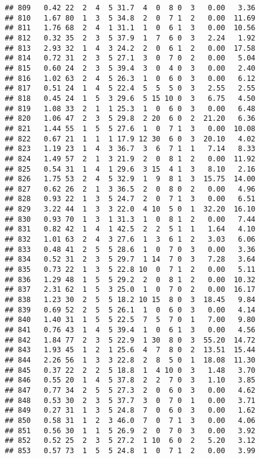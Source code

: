 \documentclass[
]{article}
\begin{document}
\begin{verbatim}
## 809   0.42 22  2  4  5 31.7  4  0  8 0  3   0.00   3.36
## 810   1.67 80  1  3  5 34.8  2  0  7 1  2   0.00  11.69
## 811   1.76 68  2  4  1 31.1  1  0  6 1  3   0.00  10.56
## 812   0.32 35  2  3  5 37.9  1  7  6 0  3   2.24   1.92
## 813   2.93 32  1  4  3 24.2  2  0  6 1  2   0.00  17.58
## 814   0.72 31  2  3  5 27.1  3  0  7 0  2   0.00   5.04
## 815   0.60 24  2  3  5 39.4  3  0  4 0  3   0.00   2.40
## 816   1.02 63  2  4  5 26.3  1  0  6 0  3   0.00   6.12
## 817   0.51 24  1  4  5 22.4  5  5  5 0  3   2.55   2.55
## 818   0.45 24  1  5  3 29.6  5 15 10 0  3   6.75   4.50
## 819   1.08 33  2  1  1 25.3  1  0  6 0  3   0.00   6.48
## 820   1.06 47  2  3  5 29.8  2 20  6 0  2  21.20   6.36
## 821   1.44 55  1  5  5 27.6  1  0  7 1  3   0.00  10.08
## 822   0.67 21  1  1  1 17.9 12 30  6 0  3  20.10   4.02
## 823   1.19 23  1  4  3 36.7  3  6  7 1  1   7.14   8.33
## 824   1.49 57  2  1  3 21.9  2  0  8 1  2   0.00  11.92
## 825   0.54 31  1  4  1 29.6  3 15  4 1  3   8.10   2.16
## 826   1.75 53  2  4  5 32.9  1  9  8 1  3  15.75  14.00
## 827   0.62 26  2  1  3 36.5  2  0  8 0  2   0.00   4.96
## 828   0.93 22  1  3  5 24.7  2  0  7 1  3   0.00   6.51
## 829   3.22 44  1  3  3 22.0  4 10  5 0  1  32.20  16.10
## 830   0.93 70  1  3  1 31.3  1  0  8 1  2   0.00   7.44
## 831   0.82 42  1  4  1 42.5  2  2  5 1  1   1.64   4.10
## 832   1.01 63  2  4  3 27.6  1  3  6 1  2   3.03   6.06
## 833   0.48 41  2  5  5 28.6  1  0  7 0  3   0.00   3.36
## 834   0.52 31  2  3  5 29.7  1 14  7 0  3   7.28   3.64
## 835   0.73 22  1  3  5 22.8 10  0  7 1  2   0.00   5.11
## 836   1.29 48  1  5  5 29.2  2  0  8 1  2   0.00  10.32
## 837   2.31 62  1  5  3 25.0  1  0  7 0  2   0.00  16.17
## 838   1.23 30  2  5  5 18.2 10 15  8 0  3  18.45   9.84
## 839   0.69 52  2  5  5 26.1  1  0  6 0  3   0.00   4.14
## 840   1.40 31  1  5  5 22.5  7  5  7 0  1   7.00   9.80
## 841   0.76 43  1  4  5 39.4  1  0  6 1  3   0.00   4.56
## 842   1.84 77  2  3  5 22.9  1 30  8 0  3  55.20  14.72
## 843   1.93 45  1  2  1 25.6  4  7  8 0  2  13.51  15.44
## 844   2.26 56  1  3  3 22.8  2  8  5 0  1  18.08  11.30
## 845   0.37 22  2  2  5 18.8  1  4 10 0  3   1.48   3.70
## 846   0.55 20  1  4  5 37.8  2  2  7 0  3   1.10   3.85
## 847   0.77 34  2  5  5 27.3  2  0  6 0  3   0.00   4.62
## 848   0.53 30  2  3  5 37.7  3  0  7 0  1   0.00   3.71
## 849   0.27 31  1  3  5 24.8  7  0  6 0  3   0.00   1.62
## 850   0.58 31  1  2  3 46.0  7  0  7 1  3   0.00   4.06
## 851   0.56 30  1  1  5 26.9  2  0  7 0  3   0.00   3.92
## 852   0.52 25  2  3  5 27.2  1 10  6 0  2   5.20   3.12
## 853   0.57 73  1  5  5 24.8  1  0  7 1  2   0.00   3.99

\end{verbatim}
\end{document}

